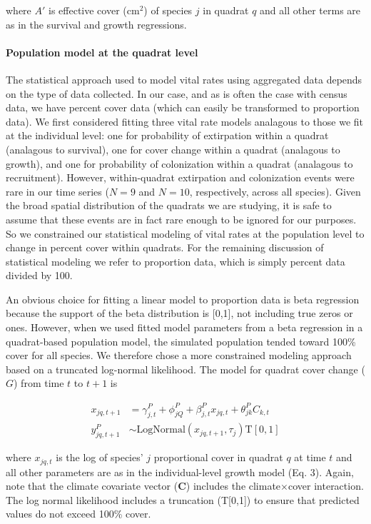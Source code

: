 \documentclass[12pt,]{article}
\begin{document}
where $A'$ is effective cover ($\text{cm}^2$) of species $j$ in quadrat
$q$ and all other terms are as in the survival and growth regressions.

\paragraph{Population model at the quadrat
level}\label{population-model-at-the-quadrat-level}

The statistical approach used to model vital rates using aggregated data
depends on the type of data collected. In our case, and as is often the
case with census data, we have percent cover data (which can easily be
transformed to proportion data). We first considered fitting three vital
rate models analagous to those we fit at the individual level: one for
probability of extirpation within a quadrat (analagous to survival), one
for cover change within a quadrat (analagous to growth), and one for
probability of colonization within a quadrat (analagous to recruitment).
However, within-quadrat extirpation and colonization events were rare in
our time series ($N=9$ and $N=10$, respectively, across all species).
Given the broad spatial distribution of the quadrats we are studying, it
is safe to assume that these events are in fact rare enough to be
ignored for our purposes. So we constrained our statistical modeling of
vital rates at the population level to change in percent cover within
quadrats. For the remaining discussion of statistical modeling we refer
to proportion data, which is simply percent data divided by 100.

An obvious choice for fitting a linear model to proportion data is beta
regression because the support of the beta distribution is {[}0,1{]},
not including true zeros or ones. However, when we used fitted model
parameters from a beta regression in a quadrat-based population model,
the simulated population tended toward 100\% cover for all species. We
therefore chose a more constrained modeling approach based on a
truncated log-normal likelihood. The model for quadrat cover change
($G$) from time $t$ to $t+1$ is

\begin{align}
x_{jq,t+1} &= \gamma^{P}_{j,t} + \phi^{P}_{jQ} + \beta^{P}_{j,t}x_{jq,t} + \theta^{P}_{jk}C_{k,t} \\
y^{P}_{jq,t+1} &\sim \text{LogNormal}(x_{jq,t+1}, \tau_{j}) \text{T}[0,1]
\end{align}

where $x_{jq,t}$ is the log of species' $j$ proportional cover in
quadrat $q$ at time $t$ and all other parameters are as in the
individual-level growth model (Eq. 3). Again, note that the climate
covariate vector (\textbf{C}) includes the climate$\times$cover
interaction. The log normal likelihood includes a truncation
(T{[}0,1{]}) to ensure that predicted values do not exceed 100\% cover.
\end{document}
